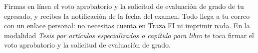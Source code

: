 \documentclass[11pt,a4paper]{article}
\begin{document}
{\small\tableofcontents}
\newpage
\begin{quevasahacer}
Firmas en línea el voto aprobatorio y la solicitud de evaluación de grado de tu egresado, y recibes la notificación de la fecha del examen. Todo llega a tu correo con un enlace personal: no necesitas cuenta en Traza FI ni imprimir nada. En la modalidad \emph{Tesis por artículos especializados o capítulo para libro} te toca firmar el voto aprobatorio y la solicitud de evaluación de grado.
\end{quevasahacer}




\end{document}

